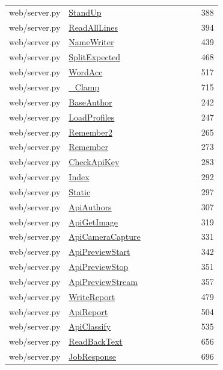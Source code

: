 \documentclass[11pt,a4paper,oneside]{report}
\begin{document}
\begin{longtable}{p{0.28\linewidth}p{0.48\linewidth}r}
web/server.py & \hyperref[fn:web-server:StandUp]{StandUp} & 388\\
web/server.py & \hyperref[fn:web-server:ReadAllLines]{ReadAllLines} & 394\\
web/server.py & \hyperref[fn:web-server:NameWriter]{NameWriter} & 439\\
web/server.py & \hyperref[fn:web-server:SplitExpected]{SplitExpected} & 468\\
web/server.py & \hyperref[fn:web-server:WordAcc]{WordAcc} & 517\\
web/server.py & \hyperref[fn:web-server:-Clamp]{\_Clamp} & 715\\
web/server.py & \hyperref[fn:web-server:BaseAuthor]{BaseAuthor} & 242\\
web/server.py & \hyperref[fn:web-server:LoadProfiles]{LoadProfiles} & 247\\
web/server.py & \hyperref[fn:web-server:Remember2]{Remember2} & 265\\
web/server.py & \hyperref[fn:web-server:Remember]{Remember} & 273\\
web/server.py & \hyperref[fn:web-server:CheckApiKey]{CheckApiKey} & 283\\
web/server.py & \hyperref[fn:web-server:Index]{Index} & 292\\
web/server.py & \hyperref[fn:web-server:Static]{Static} & 297\\
web/server.py & \hyperref[fn:web-server:ApiAuthors]{ApiAuthors} & 307\\
web/server.py & \hyperref[fn:web-server:ApiGetImage]{ApiGetImage} & 319\\
web/server.py & \hyperref[fn:web-server:ApiCameraCapture]{ApiCameraCapture} & 331\\
web/server.py & \hyperref[fn:web-server:ApiPreviewStart]{ApiPreviewStart} & 342\\
web/server.py & \hyperref[fn:web-server:ApiPreviewStop]{ApiPreviewStop} & 351\\
web/server.py & \hyperref[fn:web-server:ApiPreviewStream]{ApiPreviewStream} & 357\\
web/server.py & \hyperref[fn:web-server:WriteReport]{WriteReport} & 479\\
web/server.py & \hyperref[fn:web-server:ApiReport]{ApiReport} & 504\\
web/server.py & \hyperref[fn:web-server:ApiClassify]{ApiClassify} & 535\\
web/server.py & \hyperref[fn:web-server:ReadBackText]{ReadBackText} & 656\\
web/server.py & \hyperref[fn:web-server:JobResponse]{JobResponse} & 696\\

\end{longtable}
\end{document}
